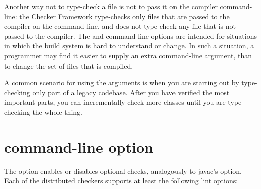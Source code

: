 Another way not to type-check a file is not to pass it on the compiler
command-line:  the Checker Framework type-checks only files that are passed
to the compiler on the command line, and does not type-check any file that
is not passed to the compiler.  The  and 
command-line options
are intended for situations in which the build system is hard to understand
or change.  In such a situation, a programmer may find it easier to supply
an extra command-line argument, than to change the set of files that is
compiled.

A common scenario for using the arguments is when you are starting out by
type-checking only part of a legacy codebase.  After you have verified the
most important parts, you can incrementally check more classes until you
are type-checking the whole thing.


\section{ command-line option\label{alint}}

\label{lint-options}

The  option enables or disables optional checks, analogously to
javac's  option.
Each of the distributed checkers supports at least the following lint options:





